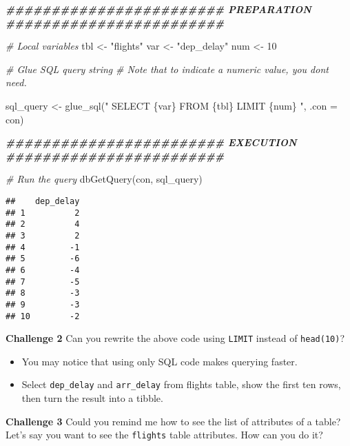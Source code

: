 \documentclass[
]{book}
\newenvironment{Shaded}{\begin{snugshade}}{\end{snugshade}}
\newcommand{\AttributeTok}[1]{\textcolor[rgb]{0.77,0.63,0.00}{#1}}
\newcommand{\CommentTok}[1]{\textcolor[rgb]{0.56,0.35,0.01}{\textit{#1}}}
\newcommand{\DecValTok}[1]{\textcolor[rgb]{0.00,0.00,0.81}{#1}}
\newcommand{\DocumentationTok}[1]{\textcolor[rgb]{0.56,0.35,0.01}{\textbf{\textit{#1}}}}
\newcommand{\FunctionTok}[1]{\textcolor[rgb]{0.00,0.00,0.00}{#1}}
\newcommand{\NormalTok}[1]{#1}
\newcommand{\OtherTok}[1]{\textcolor[rgb]{0.56,0.35,0.01}{#1}}
\newcommand{\StringTok}[1]{\textcolor[rgb]{0.31,0.60,0.02}{#1}}
\begin{document}
\begin{Shaded}
\begin{Highlighting}[]
\DocumentationTok{\#\#\#\#\#\#\#\#\#\#\#\#\#\#\#\#\#\#\#\#\#\#\#\# PREPARATION \#\#\#\#\#\#\#\#\#\#\#\#\#\#\#\#\#\#\#\#\#\#\#\#}

\CommentTok{\# Local variables }
\NormalTok{tbl }\OtherTok{\textless{}{-}} \StringTok{"flights"}
\NormalTok{var }\OtherTok{\textless{}{-}} \StringTok{"dep\_delay"}
\NormalTok{num }\OtherTok{\textless{}{-}} \DecValTok{10}

\CommentTok{\# Glue SQL query string }
\CommentTok{\# Note that to indicate a numeric value, you don\textquotesingle{}t need.}

\NormalTok{sql\_query }\OtherTok{\textless{}{-}} \FunctionTok{glue\_sql}\NormalTok{(}\StringTok{"}
\StringTok{  SELECT \{\textasciigrave{}var\textasciigrave{}\}}
\StringTok{  FROM \{\textasciigrave{}tbl\textasciigrave{}\}}
\StringTok{  LIMIT \{num\} }
\StringTok{  "}\NormalTok{, }\AttributeTok{.con =}\NormalTok{ con)}

\DocumentationTok{\#\#\#\#\#\#\#\#\#\#\#\#\#\#\#\#\#\#\#\#\#\#\#\# EXECUTION \#\#\#\#\#\#\#\#\#\#\#\#\#\#\#\#\#\#\#\#\#\#\#\#}

\CommentTok{\# Run the query }
\FunctionTok{dbGetQuery}\NormalTok{(con, sql\_query)}
\end{Highlighting}
\end{Shaded}

\begin{verbatim}
##    dep_delay
## 1          2
## 2          4
## 3          2
## 4         -1
## 5         -6
## 6         -4
## 7         -5
## 8         -3
## 9         -3
## 10        -2
\end{verbatim}

\textbf{Challenge 2}
Can you rewrite the above code using \texttt{LIMIT} instead of \texttt{head(10)}?

\begin{itemize}
\item
  You may notice that using only SQL code makes querying faster.
\item
  Select \texttt{dep\_delay} and \texttt{arr\_delay} from flights table, show the first ten rows, then turn the result into a tibble.
\end{itemize}

\textbf{Challenge 3}
Could you remind me how to see the list of attributes of a table? Let's say you want to see the \texttt{flights} table attributes. How can you do it?
\end{document}
